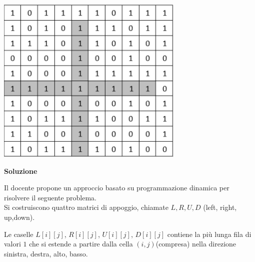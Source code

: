 \documentclass[../cheatSheetAlgoritmi.tex]{subfiles}
\begin{document}
\begin{center}
\includegraphics{../img/esame_07022019}
\end{center}
\textbf{Soluzione} 

Il docente propone un approccio basato su programmazione dinamica per risolvere il seguente problema. \\ Si costruiscono quattro matrici di appoggio, chiamate $L,R,U,D$ (left, right, up,down). 

Le caselle $L[i][j]$, $R[i][j]$, $U[i][j]$, $D[i][j]$ contiene la più lunga fila di valori $1$ che si estende a partire dalla cella $(i, j)$(compresa) nella direzione sinistra, destra, alto, basso. 
\end{document}
